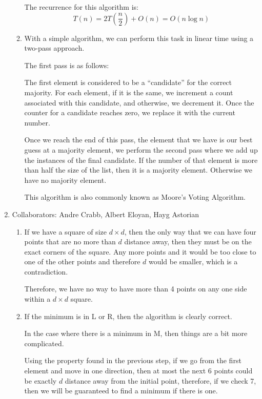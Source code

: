 \documentclass[11pt]{article}
\begin{document}
\begin{enumerate}
\begin{enumerate}
The recurrence for this algorithm is:
\begin{equation*}
T(n) = 2T\left( \frac{n}{2} \right) + O(n) = O(n\log n)
\end{equation*}

\item

With a simple algorithm, we can perform this task in linear time using a
two-pass approach. 

The first pass is as follows:

The first element is considered to be a ``candidate'' for the correct majority.
For each element, if it is the same, we increment a count associated with this
candidate, and otherwise, we decrement it. Once the counter for a candidate
reaches zero, we replace it with the current number. 

Once we reach the end of this pass, the element that we have is our best guess
at a majority element, we perform the second pass where we add up the instances
of the final candidate. If the number of that element is more than half the size
of the list, then it is a majority element. Otherwise we have no majority
element. 

This algorithm is also commonly known as Moore's Voting Algorithm.

\end{enumerate}


\newpage

\item
Collaborators: Andre Crabb, Albert Eloyan, Hayg Astorian 

\begin{enumerate}

\item
If we have a square of size $d \times d$, then the only way that we can have
four points that are no more than $d$ distance away, then they must be on the
exact corners of the square. Any more points and it would be too close to one of
the other points and therefore $d$ would be smaller, which is a contradiction. 

Therefore, we have no way to have more than 4 points on any one side within a
$d \times d$ square. 

\item
If the minimum is in L or R, then the algorithm is clearly correct. 

In the case where there is a minimum in M, then things are a bit more
complicated. 

Using the property found in the previous step, if we go from the first element
and move in one direction, then at most the next 6 points could be exactly $d$
distance away from the initial point, therefore, if we check 7, then we will be
guaranteed to find a minimum if there is one. 


\end{enumerate}
\end{enumerate}
\end{document}
